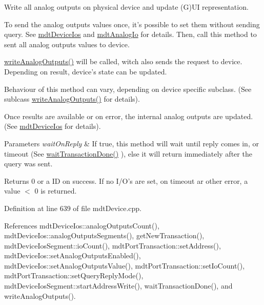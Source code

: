 Write all analog outputs on physical device and update (G)U\-I representation. 

To send the analog outputs values once, it's possible to set them without sending query. See \hyperlink{classmdt_device_ios}{mdt\-Device\-Ios} and \hyperlink{classmdt_analog_io}{mdt\-Analog\-Io} for details. Then, call this method to sent all analog outputs values to device.

\hyperlink{classmdt_device_a2d82cb0920e4e0628186e59f9b4de7d4}{write\-Analog\-Outputs()} will be called, witch also sends the request to device. Depending on result, device's state can be updated.

Behaviour of this method can vary, depending on device specific subclass. (See sublcass \hyperlink{classmdt_device_a2d82cb0920e4e0628186e59f9b4de7d4}{write\-Analog\-Outputs()} for details).

Once results are available or on error, the internal analog outputs are updated. (See \hyperlink{classmdt_device_ios}{mdt\-Device\-Ios} for details).


\begin{DoxyParams}{Parameters}
{\em wait\-On\-Reply} & If true, this method will wait until reply comes in, or timeout (See \hyperlink{classmdt_device_ab937015c1a319b7234442a4cc29a02a8}{wait\-Transaction\-Done()} ), else it will return immediately after the query was sent. \\
\hline
\end{DoxyParams}
\begin{DoxyReturn}{Returns}
0 or a I\-D on success. If no I/\-O's are set, on timeout ar other error, a value $<$ 0 is returned. 
\end{DoxyReturn}


Definition at line 639 of file mdt\-Device.\-cpp.



References mdt\-Device\-Ios\-::analog\-Outputs\-Count(), mdt\-Device\-Ios\-::analog\-Outputs\-Segments(), get\-New\-Transaction(), mdt\-Device\-Ios\-Segment\-::io\-Count(), mdt\-Port\-Transaction\-::set\-Address(), mdt\-Device\-Ios\-::set\-Analog\-Outputs\-Enabled(), mdt\-Device\-Ios\-::set\-Analog\-Outputs\-Value(), mdt\-Port\-Transaction\-::set\-Io\-Count(), mdt\-Port\-Transaction\-::set\-Query\-Reply\-Mode(), mdt\-Device\-Ios\-Segment\-::start\-Address\-Write(), wait\-Transaction\-Done(), and write\-Analog\-Outputs().

